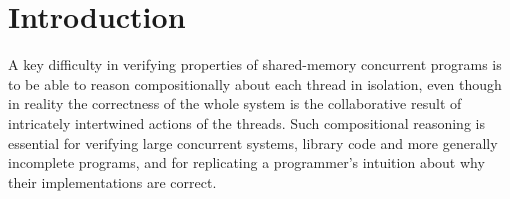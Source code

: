 \chapter{Introduction}\label{chapter:introduction}

A key difficulty in verifying properties of shared-memory concurrent programs is to be able to reason compositionally about each thread in isolation, even though in reality the correctness of the whole system is the collaborative result of intricately intertwined actions of the threads. Such compositional reasoning is essential for verifying large concurrent systems, library code and more generally incomplete programs, and for replicating a programmer's intuition about why their implementations are correct.


